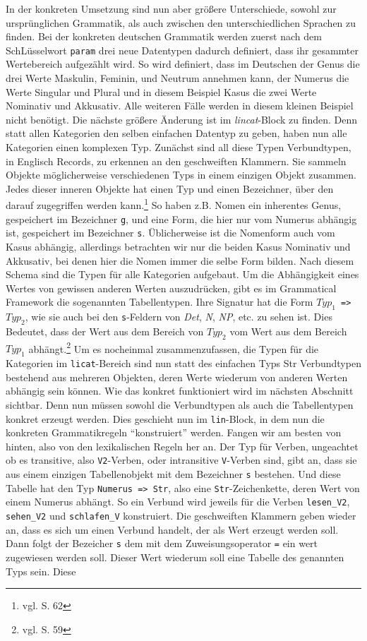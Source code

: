 \documentclass[12pt,abstract=on,titlepage,bibliography=totoc,ngerman,listof=totoc]{scrreprt}
\begin{document}
In der konkreten Umsetzung sind nun aber größere Unterschiede, sowohl zur ursprünglichen Grammatik, als auch zwischen den unterschiedlichen Sprachen zu finden. Bei der konkreten deutschen Grammatik werden zuerst nach dem SchLüsselwort \texttt{param} drei neue Datentypen dadurch definiert, dass ihr gesammter Wertebereich aufgezählt wird. So wird definiert, dass im Deutschen der Genus die drei Werte Maskulin, Feminin, und Neutrum annehmen kann, der Numerus die Werte Singular und Plural und in diesem Beispiel Kasus die zwei Werte Nominativ und Akkusativ. Alle weiteren Fälle werden in diesem kleinen Beispiel nicht benötigt. Die nächste größere Änderung ist im \textit{lincat}-Block zu finden. Denn statt allen Kategorien den selben einfachen Datentyp zu geben, haben nun alle Kategorien einen komplexen Typ. Zunächst sind all diese Typen Verbundtypen, in Englisch Records, zu erkennen an den geschweiften Klammern. Sie sammeln Objekte möglicherweise verschiedenen Typs in einem einzigen Objekt zusammen. Jedes dieser inneren Objekte hat einen Typ und einen Bezeichner, über den darauf zugegriffen werden kann.\footnote{vgl. \cite{RANTA2011} S. 62} So haben z.B. Nomen ein inherentes Genus, gespeichert im Bezeichner \texttt{g}, und eine Form, die hier nur vom Numerus abhängig ist, gespeichert im Bezeichner \texttt{s}. Üblicherweise ist die Nomenform auch vom Kasus abhängig, allerdings betrachten wir nur die beiden Kasus Nominativ und Akkusativ, bei denen hier die Nomen immer die selbe Form bilden. Nach diesem Schema sind die Typen für alle Kategorien aufgebaut. Um die Abhängigkeit eines Wertes von gewissen anderen Werten auszudrücken, gibt es im Grammatical Framework die sogenannten Tabellentypen. Ihre Signatur hat die Form \texttt{$Typ_1$ => $Typ_2$}, wie sie auch bei den \texttt{s}-Feldern von \textit{Det}, \textit{N}, \textit{NP}, etc. zu sehen ist. Dies Bedeutet, dass der Wert aus dem Bereich von $Typ_2$ vom Wert aus dem Bereich $Typ_1$ abhängt.\footnote{vgl. \cite{RANTA2011} S. 59} Um es nocheinmal zusammenzufassen, die Typen für die Kategorien im \texttt{licat}-Bereich sind nun statt des einfachen Typs Str Verbundtypen bestehend aus mehreren Objekten, deren Werte wiederum von anderen Werten abhängig sein können. Wie das konkret funktioniert wird im nächsten Abschnitt sichtbar. Denn nun müssen sowohl die Verbundtypen als auch die Tabellentypen konkret erzeugt werden. Dies geschieht nun im \texttt{lin}-Block, in dem nun die konkreten Grammatikregeln ``konstruiert'' werden. Fangen wir am besten von hinten, also von den lexikalischen Regeln her an. Der Typ für Verben, ungeachtet ob es transitive, also \texttt{V2}-Verben, oder intransitive \texttt{V}-Verben sind, gibt an, dass sie aus einem einzigen Tabellenobjekt mit dem Bezeichner \texttt{s} bestehen. Und diese Tabelle hat den Typ \texttt{Numerus => Str}, also eine \texttt{Str}-Zeichenkette, deren Wert von einem Numerus abhängt. So ein Verbund wird jeweils für die Verben \texttt{lesen\_V2}, \texttt{sehen\_V2} und \texttt{schlafen\_V} konstruiert. Die geschweiften Klammern geben wieder an, dass es sich um einen Verbund handelt, der als Wert erzeugt werden soll. Dann folgt der Bezeicher \texttt{s} dem mit dem Zuweisungsoperator \texttt{=} ein wert zugewiesen werden soll. Dieser Wert wiederum soll eine Tabelle des genannten Typs sein. Diese 
\end{document}
